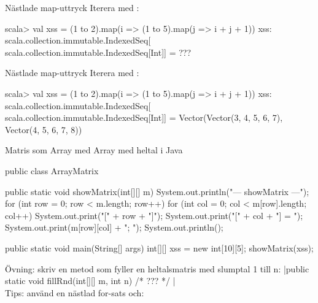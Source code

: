 \begin{Slide}{Nästlade map-uttryck}\SlideFontSmall
Iterera med :\\
\begin{REPL}
scala> val xss = (1 to 2).map(i => (1 to 5).map(j => i + j + 1))
xss:
  scala.collection.immutable.IndexedSeq[
    scala.collection.immutable.IndexedSeq[Int]] =
      ???
\end{REPL}
\end{Slide}

\begin{Slide}{Nästlade map-uttryck}\SlideFontSmall
Iterera med :\\
\begin{REPL}
scala> val xss = (1 to 2).map(i => (1 to 5).map(j => i + j + 1))
xss:
  scala.collection.immutable.IndexedSeq[
    scala.collection.immutable.IndexedSeq[Int]] =
      Vector(Vector(3, 4, 5, 6, 7), Vector(4, 5, 6, 7, 8))
\end{REPL}
\end{Slide}




\begin{Slide}{Matris som Array med Array med heltal i Java}\SlideFontTiny
\begin{CodeSmall}[language=Java]
public class ArrayMatrix {

    public static void showMatrix(int[][] m){
        System.out.println("\n--- showMatrix ---");
        for (int row = 0; row < m.length; row++){
            for (int col = 0; col < m[row].length; col++) {
                System.out.print("[" + row + "]");
                System.out.print("[" + col + "] = ");
                System.out.print(m[row][col] + "; ");
            }
            System.out.println();
        }
    }

    public static void main(String[] args) {
        int[][] xss = new int[10][5];
        showMatrix(xss);
    }
}
\end{CodeSmall}
\pause
Övning: skriv en metod  som fyller en heltalsmatris med slumptal 1 till n:
\pause
\jcode|public static void fillRnd(int[][] m, int n){ /* ??? */ }| \\
\pause
Tips: använd en nästlad for-sats och: \\

\end{Slide}

